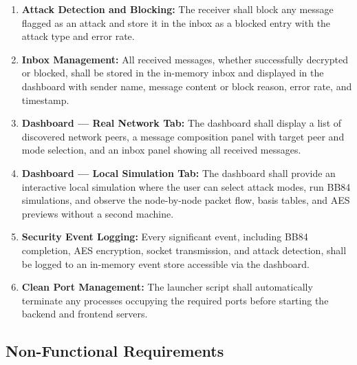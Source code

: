 \begin{enumerate}
    \item \textbf{Attack Detection and Blocking:} The receiver shall block any message flagged as an attack and store it in the inbox as a blocked entry with the attack type and error rate.

    \item \textbf{Inbox Management:} All received messages, whether successfully decrypted or blocked, shall be stored in the in-memory inbox and displayed in the dashboard with sender name, message content or block reason, error rate, and timestamp.

    \item \textbf{Dashboard --- Real Network Tab:} The dashboard shall display a list of discovered network peers, a message composition panel with target peer and mode selection, and an inbox panel showing all received messages.

    \item \textbf{Dashboard --- Local Simulation Tab:} The dashboard shall provide an interactive local simulation where the user can select attack modes, run BB84 simulations, and observe the node-by-node packet flow, basis tables, and AES previews without a second machine.

    \item \textbf{Security Event Logging:} Every significant event, including BB84 completion, AES encryption, socket transmission, and attack detection, shall be logged to an in-memory event store accessible via the dashboard.

    \item \textbf{Clean Port Management:} The launcher script shall automatically terminate any processes occupying the required ports before starting the backend and frontend servers.
\end{enumerate}

\subsection{Non-Functional Requirements}

